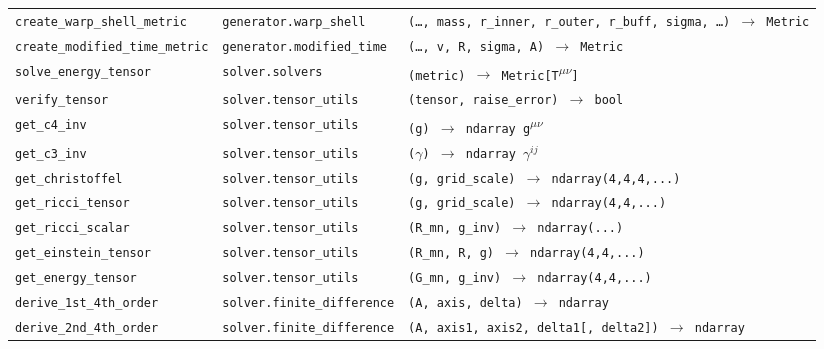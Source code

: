 \documentclass[11pt, a4paper, twoside]{report}
\begin{document}
\begin{longtable}{p{4.5cm} p{3.0cm} p{6.8cm}}
  \texttt{create\_warp\_shell\_metric}
  & \texttt{generator.warp\_shell}
  & \texttt{(\ldots, mass, r\_inner, r\_outer, r\_buff, sigma, \ldots) $\to$ Metric} \\[0.3em]

  \texttt{create\_modified\_time\_metric}
  & \texttt{generator.modified\_time}
  & \texttt{(\ldots, v, R, sigma, A) $\to$ Metric} \\[0.3em]

  \texttt{solve\_energy\_tensor}
  & \texttt{solver.solvers}
  & \texttt{(metric) $\to$ Metric[T\textsuperscript{$\mu\nu$}]} \\[0.3em]

  \texttt{verify\_tensor}
  & \texttt{solver.tensor\_utils}
  & \texttt{(tensor, raise\_error) $\to$ bool} \\[0.3em]

  \texttt{get\_c4\_inv}
  & \texttt{solver.tensor\_utils}
  & \texttt{(g) $\to$ ndarray g\textsuperscript{$\mu\nu$}} \\[0.3em]

  \texttt{get\_c3\_inv}
  & \texttt{solver.tensor\_utils}
  & \texttt{($\gamma$) $\to$ ndarray $\gamma^{ij}$} \\[0.3em]

  \texttt{get\_christoffel}
  & \texttt{solver.tensor\_utils}
  & \texttt{(g, grid\_scale) $\to$ ndarray(4,4,4,...)} \\[0.3em]

  \texttt{get\_ricci\_tensor}
  & \texttt{solver.tensor\_utils}
  & \texttt{(g, grid\_scale) $\to$ ndarray(4,4,...)} \\[0.3em]

  \texttt{get\_ricci\_scalar}
  & \texttt{solver.tensor\_utils}
  & \texttt{(R\_mn, g\_inv) $\to$ ndarray(...)} \\[0.3em]

  \texttt{get\_einstein\_tensor}
  & \texttt{solver.tensor\_utils}
  & \texttt{(R\_mn, R, g) $\to$ ndarray(4,4,...)} \\[0.3em]

  \texttt{get\_energy\_tensor}
  & \texttt{solver.tensor\_utils}
  & \texttt{(G\_mn, g\_inv) $\to$ ndarray(4,4,...)} \\[0.3em]

  \texttt{derive\_1st\_4th\_order}
  & \texttt{solver.finite\_difference}
  & \texttt{(A, axis, delta) $\to$ ndarray} \\[0.3em]

  \texttt{derive\_2nd\_4th\_order}
  & \texttt{solver.finite\_difference}
  & \texttt{(A, axis1, axis2, delta1[, delta2]) $\to$ ndarray} \\[0.3em]


\end{longtable}
\end{document}
